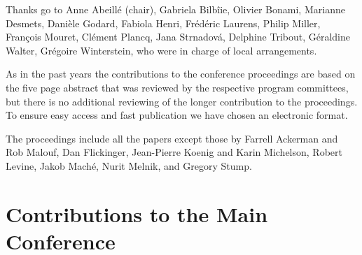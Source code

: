\documentclass[11pt,a4paper,fleqn]{article}
\begin{document}
Thanks go to Anne Abeillé (chair), Gabriela Bilbîie, Olivier Bonami, Marianne Desmets, Danièle Godard,
Fabiola Henri,
Frédéric Laurens,
Philip Miller,
François Mouret,
Clément Plancq,
Jana Strnadová,
Delphine Tribout,
Géraldine Walter,
Grégoire Winterstein, who were in charge of local arrangements.


As in the past years the contributions to the conference proceedings are based on the five page abstract
that was reviewed by the respective program committees, but there is no additional reviewing of the
longer contribution to the proceedings.
To ensure easy access and fast publication we have chosen an electronic format.


The proceedings include all the papers except those by Farrell Ackerman and Rob Malouf, Dan Flickinger, Jean-Pierre Koenig and Karin
Michelson, Robert Levine, Jakob Maché, Nurit Melnik, and Gregory Stump.



\newpage
\part{Contributions to the Main Conference}
















\end{document}
